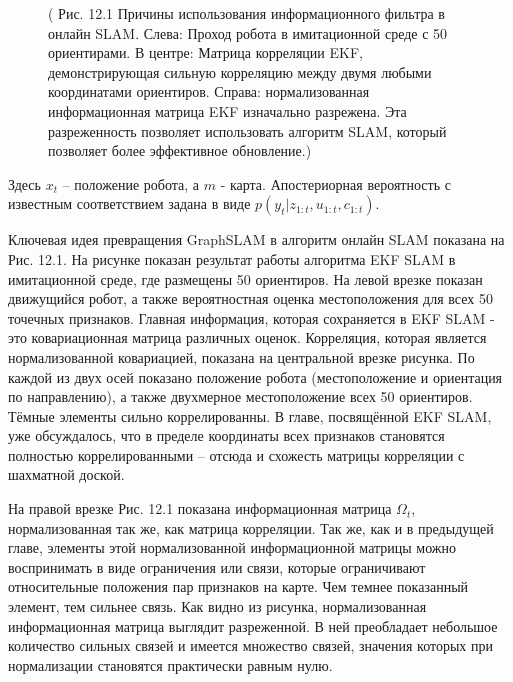 \documentclass[10pt,a4paper]{article}
\begin{document}
\begin{figure}[H]
	\caption{ ( Рис. 12.1 Причины использования информационного фильтра в онлайн SLAM. Слева: Проход робота в имитационной среде с 50 ориентирами. В центре: Матрица корреляции EKF, демонстрирующая сильную корреляцию между двумя любыми координатами ориентиров. Справа: нормализованная информационная матрица EKF изначально разрежена. Эта разреженность позволяет использовать алгоритм SLAM, который позволяет более эффективное обновление.) }
	\label{fig:121orig}
\end{figure}

Здесь $x_t$ – положение робота, а $m$ - карта. Апостериорная вероятность с известным соответствием задана в виде $p(y_t|z_{1:t}, u_{1:t}, c_{1:t})$.

Ключевая идея превращения GraphSLAM в алгоритм онлайн SLAM показана на Рис. 12.1. На рисунке показан результат работы алгоритма EKF SLAM в имитационной среде, где размещены 50 ориентиров. На левой врезке показан движущийся робот, а также вероятностная оценка местоположения для всех 50 точечных признаков. Главная информация, которая сохраняется в EKF SLAM - это ковариационная матрица различных оценок. Корреляция, которая является нормализованной ковариацией, показана на центральной врезке рисунка. По каждой из двух осей показано положение робота (местоположение и ориентация по направлению), а также двухмерное местоположение всех 50 ориентиров. Тёмные элементы сильно коррелированны. В главе, посвящённой EKF SLAM, уже обсуждалось, что в пределе координаты всех признаков становятся полностью коррелированными – отсюда и схожесть матрицы корреляции с шахматной доской.

На правой врезке Рис. 12.1 показана информационная матрица $\varOmega_t$, нормализованная так же, как матрица корреляции. Так же, как и в предыдущей главе, элементы этой нормализованной информационной матрицы можно воспринимать в виде ограничения или связи, которые ограничивают относительные положения пар признаков на карте. Чем темнее показанный элемент, тем сильнее связь. Как видно из рисунка, нормализованная информационная матрица выглядит разреженной. В ней преобладает небольшое количество сильных связей и имеется множество связей, значения которых при нормализации становятся практически равным нулю. 
\end{document}

